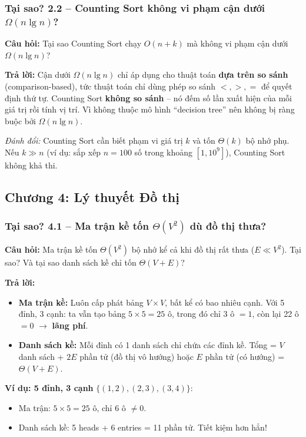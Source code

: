 \documentclass[10pt]{article}
\begin{document}
\subsubsection{Tại sao? 2.2 -- Counting Sort không vi phạm cận dưới $\Omega(n \lg n)$?}\label{whyans:2.2}

\textbf{Câu hỏi:} Tại sao Counting Sort chạy $O(n+k)$ mà không vi phạm cận dưới $\Omega(n \lg n)$?

\textbf{Trả lời:} Cận dưới $\Omega(n \lg n)$ chỉ áp dụng cho thuật toán \textbf{dựa trên so sánh} (comparison-based), tức thuật toán chỉ dùng phép so sánh $<, >, =$ để quyết định thứ tự. Counting Sort \textbf{không so sánh} -- nó đếm số lần xuất hiện của mỗi giá trị rồi tính vị trí. Vì không thuộc mô hình ``decision tree'' nên không bị ràng buộc bởi $\Omega(n \lg n)$.

\textit{Đánh đổi:} Counting Sort cần biết phạm vi giá trị $k$ và tốn $\Theta(k)$ bộ nhớ phụ. Nếu $k \gg n$ (ví dụ: sắp xếp $n = 100$ số trong khoảng $[1, 10^9]$), Counting Sort không khả thi.

\subsection{Chương 4: Lý thuyết Đồ thị}

\subsubsection{Tại sao? 4.1 -- Ma trận kề tốn $\Theta(V^2)$ dù đồ thị thưa?}\label{whyans:4.1}

\textbf{Câu hỏi:} Ma trận kề tốn $\Theta(V^2)$ bộ nhớ kể cả khi đồ thị rất thưa ($E \ll V^2$). Tại sao? Và tại sao danh sách kề chỉ tốn $\Theta(V+E)$?

\textbf{Trả lời:}
\begin{itemize}
\item \textbf{Ma trận kề:} Luôn cấp phát bảng $V \times V$, bất kể có bao nhiêu cạnh. Với 5 đỉnh, 3 cạnh: ta vẫn tạo bảng $5 \times 5 = 25$ ô, trong đó chỉ 3 ô $= 1$, còn lại 22 ô $= 0$ $\to$ \textbf{lãng phí}.
\item \textbf{Danh sách kề:} Mỗi đỉnh có 1 danh sách chỉ chứa các đỉnh kề. Tổng = $V$ danh sách + $2E$ phần tử (đồ thị vô hướng) hoặc $E$ phần tử (có hướng) = $\Theta(V+E)$.
\end{itemize}

\textbf{Ví dụ: 5 đỉnh, 3 cạnh} $\{(1,2), (2,3), (3,4)\}$:
\begin{itemize}
\item Ma trận: $5 \times 5 = 25$ ô, chỉ 6 ô $\neq 0$.
\item Danh sách kề: 5 heads + 6 entries = 11 phần tử. Tiết kiệm hơn hẳn!
\end{itemize}
\end{document}
